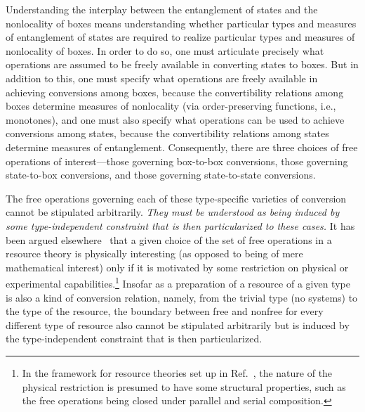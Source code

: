 \documentclass[12pt]{article}
\theoremstyle{plain}
\theoremstyle{definition}
\begin{document}
Understanding the interplay between the entanglement of states and the nonlocality of boxes means understanding whether particular types and measures of entanglement of states are required to realize particular types and measures of nonlocality of boxes.
 In order to do so, one must articulate precisely what operations are assumed to be freely available in converting states to boxes.
  But in addition to this, one must specify what operations are freely available in achieving conversions among boxes,
  because the convertibility relations among boxes
    determine measures of nonlocality (via order-preserving functions, i.e., monotones), and one must also specify what operations can be used to achieve conversions
   among states, because the convertibility relations among states 
   determine measures of entanglement.  Consequently, there are three choices of free operations of interest---those governing box-to-box conversions, those governing state-to-box conversions, and those governing state-to-state conversions.
 
The free operations governing each of these type-specific varieties of conversion cannot be stipulated arbitrarily.  {\em They must be understood as being induced by some type-independent constraint that is then particularized to these cases.}  It has been argued elsewhere~\cite{coecke2016mathematical,marvian2016quantify} that a given choice of the set of free operations in a resource theory is physically interesting (as opposed to being of mere mathematical interest) only if it is motivated by some restriction on physical or experimental capabilities.\footnote{In the framework for resource theories set up in Ref.~\cite{coecke2016mathematical}, the nature of the physical restriction is presumed to have some structural properties, such as the free operations being closed under parallel and serial composition.}  
Insofar as a preparation of a resource of a given type is also a kind of conversion relation, namely, from the trivial type  (no systems) to the type of the resource, the boundary between free and nonfree for every different type of resource also cannot be stipulated arbitrarily but is induced by the type-independent constraint that is then particularized.
 
\end{document}
